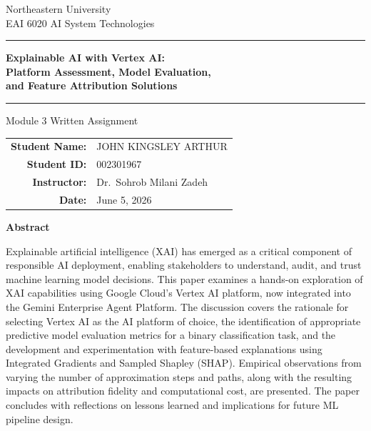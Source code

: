 \documentclass[12pt,letterpaper]{article}
\begin{document}
\thispagestyle{empty}
\begin{center}

\vspace*{1.2in}

Northeastern University\\[4pt]
EAI 6020 AI System Technologies

\vspace{0.55in}
\noindent\rule{0.65\textwidth}{0.4pt}
\vspace{0.35in}

{\large\bfseries Explainable AI with Vertex AI:}\\[10pt]
{\large\bfseries Platform Assessment, Model Evaluation,}\\[10pt]
{\large\bfseries and Feature Attribution Solutions}

\vspace{0.35in}
\noindent\rule{0.65\textwidth}{0.4pt}
\vspace{0.5in}

Module 3 Written Assignment

\vspace{0.55in}

\renewcommand{\arraystretch}{1.5}
\begin{tabular}{r l}
  \textbf{Student Name:} & JOHN KINGSLEY ARTHUR \\
  \textbf{Student ID:}   & 002301967 \\
  \textbf{Instructor:}   & Dr.\ Sohrob Milani Zadeh \\
  \textbf{Date:}         & June 5, 2026 \\
\end{tabular}

\end{center}
\newpage

\thispagestyle{fancy}
\begin{center}\textbf{Abstract}\end{center}

\noindent Explainable artificial intelligence (XAI) has emerged as a critical component
of responsible AI deployment, enabling stakeholders to understand, audit, and
trust machine learning model decisions. This paper examines a hands-on
exploration of XAI capabilities using Google Cloud's Vertex AI platform, now
integrated into the Gemini Enterprise Agent Platform. The discussion covers the
rationale for selecting Vertex AI as the AI platform of choice, the
identification of appropriate predictive model evaluation metrics for a binary
classification task, and the development and experimentation with feature-based
explanations using Integrated Gradients and Sampled Shapley (SHAP). Empirical
observations from varying the number of approximation steps and paths, along
with the resulting impacts on attribution fidelity and computational cost, are
presented. The paper concludes with reflections on lessons learned and
implications for future ML pipeline design.
\end{document}
